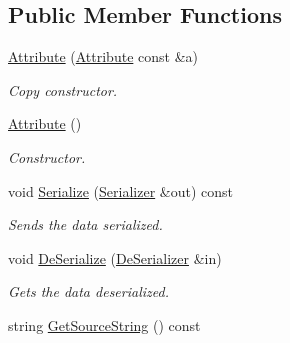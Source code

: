 \subsection*{Public Member Functions}
\begin{DoxyCompactItemize}
\item 
\hypertarget{class_common_1_1_attribute_a3ba016fa5cb64736d1d32fffda0df30d}{\hyperlink{class_common_1_1_attribute_a3ba016fa5cb64736d1d32fffda0df30d}{Attribute} (\hyperlink{class_common_1_1_attribute}{Attribute} const \&a)}\label{class_common_1_1_attribute_a3ba016fa5cb64736d1d32fffda0df30d}

\begin{DoxyCompactList}\small\item\em Copy constructor. \end{DoxyCompactList}\item 
\hyperlink{class_common_1_1_attribute_a9413ac7a553fa1b45db960aee7661bb1}{Attribute} ()
\begin{DoxyCompactList}\small\item\em Constructor. \end{DoxyCompactList}\item 
\hypertarget{class_common_1_1_attribute_a04e52cfb65fde9d7a1865889b766a252}{void \hyperlink{class_common_1_1_attribute_a04e52cfb65fde9d7a1865889b766a252}{Serialize} (\hyperlink{class_common_1_1_serializer}{Serializer} \&out) const }\label{class_common_1_1_attribute_a04e52cfb65fde9d7a1865889b766a252}

\begin{DoxyCompactList}\small\item\em Sends the data serialized. \end{DoxyCompactList}\item 
\hypertarget{class_common_1_1_attribute_ad29f02520158693684097d1d641ad663}{void \hyperlink{class_common_1_1_attribute_ad29f02520158693684097d1d641ad663}{De\-Serialize} (\hyperlink{class_common_1_1_de_serializer}{De\-Serializer} \&in)}\label{class_common_1_1_attribute_ad29f02520158693684097d1d641ad663}

\begin{DoxyCompactList}\small\item\em Gets the data deserialized. \end{DoxyCompactList}\item 
\hypertarget{class_common_1_1_attribute_ad186aab5840424763a5681a01dbda573}{string \hyperlink{class_common_1_1_attribute_ad186aab5840424763a5681a01dbda573}{Get\-Source\-String} () const }\label{class_common_1_1_attribute_ad186aab5840424763a5681a01dbda573}


\end{DoxyCompactItemize}
